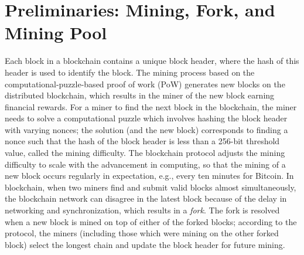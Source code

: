 \section{Preliminaries: Mining, Fork, and Mining Pool}
\label{sec:preliminaries}
Each block in a blockchain contains a unique block header, where the hash of this header is used to identify the block. %
The mining process based on the computational-puzzle-based proof of work (PoW) generates new blocks on the distributed blockchain,
which results in the miner of the new block earning financial rewards.
For a miner to find the next block in the blockchain, the miner needs to solve a computational puzzle
which involves hashing the block header with varying nonces; 
the solution (and the new block) corresponds to finding a nonce 
such that the hash of the block header is less than a 256-bit threshold value, called the mining difficulty. The blockchain protocol adjusts the mining difficulty to scale with the advancement in computing, so that the mining of a new block occurs regularly in expectation, e.g., every ten minutes for Bitcoin.  %
In blockchain, when two miners find and submit valid blocks almost simultaneously, the blockchain network can disagree in the latest block because of the delay in networking and synchronization, which results in a \emph{fork}. %
The fork is resolved when a new block is mined on top of either of the forked blocks; 
according to the protocol, the miners (including those which were mining on the other forked block) select the longest chain and update the block header for future mining. 

